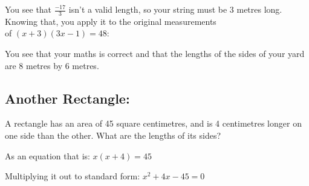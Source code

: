 \documentclass[12pt]{article}
\begin{document}
You see that $\frac{-17}{3}$ isn't a valid length, so your string must be 3 metres long.\\

Knowing that, you apply it to the original measurements\\of $(x+3)(3x-1)=48$:

\begin{center}
\end{center}

You see that your maths is correct and that the lengths of the sides of your yard are 8 metres by 6 metres.

\subsection*{Another Rectangle:}

A rectangle has an area of 45 square centimetres, and is 4 centimetres longer on one side than the other. What are the lengths of its sides?

As an equation that is: $x(x+4)=45$

Multiplying it out to standard form: $x^2+4x-45=0$
\end{document}
